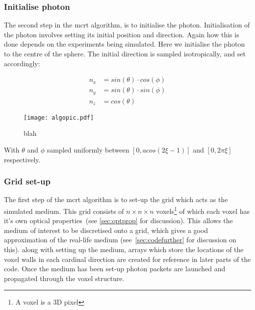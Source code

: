 \subsubsection{Initialise photon}\label{sec:algoinit}

The second step in the \gls{mcrt} algorithm, is to initialise the photon. Initialisation of the photon involves setting its initial position and direction. Again how this is done depends on the experiments being simulated. Here we initialise the photon to the centre of the sphere. The initial direction is sampled isotropically, and set accordingly:

\begin{align}
n_{x}&=sin(\theta) \cdot cos(\phi)\\
n_{y}&=sin(\theta) \cdot sin(\phi)\\
n_{z}&=cos(\theta)
\end{align}

\begin{wrapfigure}{I}{\columnwidth/2}
\texttt{[image: algopic.pdf]}
\caption{blah}
\label{fig:algo}
\end{wrapfigure}


With $\theta$ and $\phi$ sampled uniformly between $[0,acos(2\xi-1)]$ and $[0,2\pi\xi]$ respectively.


\subsubsection{Grid set-up}\label{sec:photsetup}

The first step of the \gls{mcrt} algorithm is to set-up the grid which acts as the simulated medium. This grid consists of $n \times n \times n$ voxels\footnote{A voxel is a 3D pixel} of which each voxel has it's own optical properties~(see \cref{sec:optprop} for discussion). This allows the medium of interest to be discretised onto a grid, which gives a good approximation of the real-life medium (see~\cref{sec:codefurther} for discussion on this). along with setting up the medium, arrays which store the locations of the voxel walls in each cardinal direction are created for reference in later parts of the code. Once the medium has been set-up photon packets are launched and propagated through the voxel structure.


